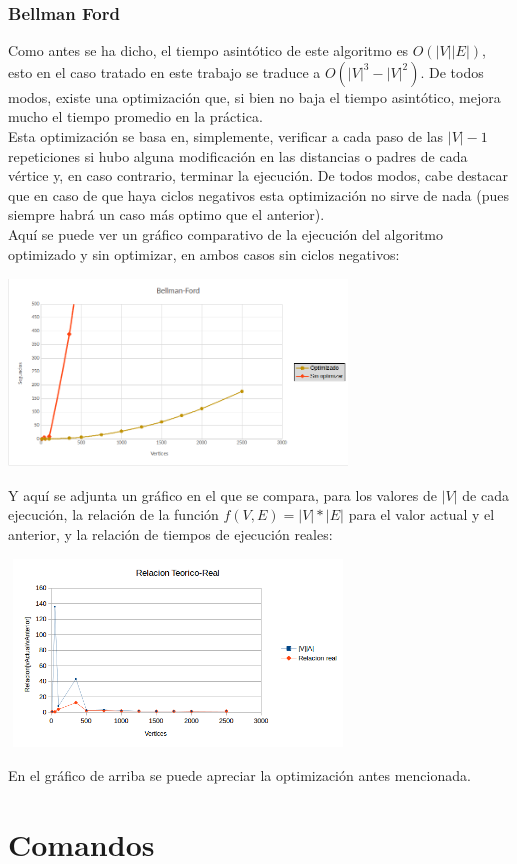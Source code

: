 \documentclass{article}
\newcommand\tab[1][0.5cm]{\hspace*{#1}}
\begin{document}
            \subsubsection{Bellman Ford}
            \tab Como antes se ha dicho, el tiempo asintótico de este algoritmo es $O(|V||E|)$, esto en el caso
            tratado en este trabajo se traduce a $O(|V|^3 - |V|^2)$. De todos modos, existe una optimización que,
            si bien no baja el tiempo asintótico, mejora mucho el tiempo promedio en la práctica. \\
            \tab Esta optimización se basa en, simplemente, verificar a cada paso de las $|V| - 1$ repeticiones
            si hubo alguna modificación en las distancias o padres de cada vértice y, en caso contrario, terminar
            la ejecución. De todos modos, cabe destacar que en caso de que haya ciclos negativos esta optimización
            no sirve de nada (pues siempre habrá un caso más optimo que el anterior). \\
            \tab Aquí se puede ver un gráfico comparativo de la ejecución del algoritmo optimizado y sin optimizar,
            en ambos casos sin ciclos negativos:
            \begin{center}
                \includegraphics[width=9cm, height=5cm]{images/GraficoBellmanFord}
            \end{center}
            \tab Y aquí se adjunta un gráfico en el que se compara, para los valores de $|V|$ de cada ejecución,
            la relación de la función $f(V, E) = |V|*|E|$ para el valor actual y el anterior, y la relación de
            tiempos de ejecución reales:
            \begin{center}
                \includegraphics[width=9cm, height=5cm]{images/RelacionBellmanFord}
            \end{center}
            \tab En el gráfico de arriba se puede apreciar la optimización antes mencionada.

    \section{Comandos}
\end{document}
